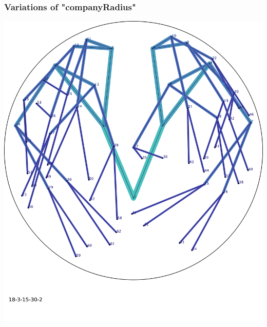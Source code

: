 \documentclass{scrartcl}
\newcommand{\imgSize}{0.46}
\begin{document}
\newpage
\subsubsection{Variations of "companyRadius"}

\begin{minipage}[t]{\imgSize\textwidth}
\includegraphics[width=\textwidth]{img_18-3-15-30-2}
\end{minipage}
\hspace{0.5cm}
\end{document}
